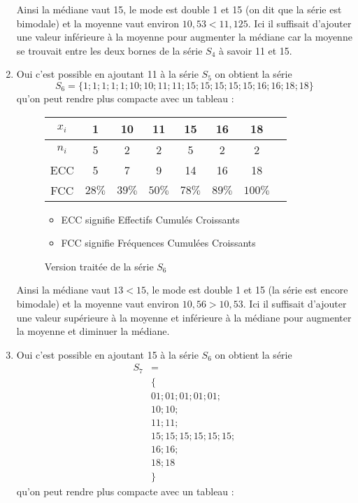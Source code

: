 \begin{enumerate}[label=C\arabic*)]
			
	Ainsi la médiane vaut 15, le mode est double 1 et 15 (on dit que la série est bimodale) et la moyenne vaut environ $10,53 < 11,125$. Ici il suffisait d'ajouter une valeur inférieure à la moyenne pour augmenter la médiane car la moyenne se trouvait entre les deux bornes de la série $S_4$ à savoir 11 et 15.
	\item Oui c'est possible en ajoutant 11 à la série $S_5$ on obtient la série \[S_6 = \{1 ; 1 ; 1 ; 1 ; 1 ; 10 ; 10 ; 11 ; 11 ; 15 ; 15 ; 15 ; 15 ; 15 ; 16 ; 16 ; 18 ; 18\}\] qu'on peut rendre plus compacte avec un tableau :
	\begin{center}
		\begin{figure}[H]
		\caption{Version traitée de la série $S_6$}
		\centering
		\vspace{.5cm}
		\begin{tabular}{*{8}{|c}|}
			\hline
			$x_i$ & 1 & 10 & 11 & 15 & 16 & 18 \\
			\hline
			$n_i$ & 5 & 2 & 2 & 5 & 2 & 2 \\
			\hline
			ECC & 5 & 7 & 9 & 14 & 16 & 18\\
			\hline
			FCC & $28\%$ & $39\%$ & $50\%$ & $78\%$ & $89\%$ & $100\%$  \\
			\hline
		\end{tabular}
			\vspace{.5cm}
			\begin{itemize}
				\item ECC signifie Effectifs Cumulés Croissants
				\item FCC signifie Fréquences Cumulées Croissants
			\end{itemize}
		\end{figure}
	\end{center}
	
	

	
	Ainsi la médiane vaut $13 < 15$, le mode est double 1 et 15 (la série est encore bimodale) et la moyenne vaut environ $10,56 > 10,53$. Ici il suffisait d'ajouter une valeur supérieure à la moyenne et inférieure à la médiane pour augmenter la moyenne et diminuer la médiane.
	\item Oui c'est possible en ajoutant 15 à la série $S_6$ on obtient la série 
	\begin{align*}
		S_7 &= \\
		& \{ \\
		& 01 ; 01 ; 01 ; 01 ; 01 ; \\
		& 10 ; 10 ; \\
		& 11 ; 11 ; \\
		& 15 ; 15 ; 15 ; 15 ; 15 ; 15 ; \\
		& 16 ; 16 ; \\
		& 18 ; 18 \\
		&\}
	\end{align*}
	qu'on peut rendre plus compacte avec un tableau :
	

\end{enumerate}
